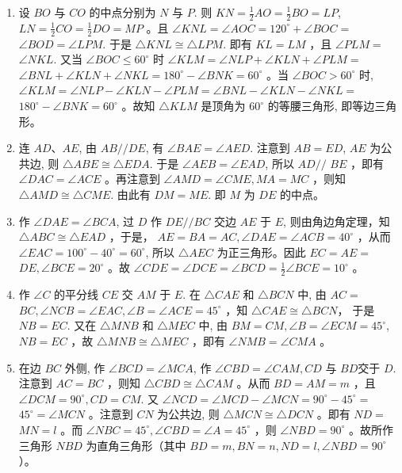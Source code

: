 \documentclass[10pt]{article}
\begin{document}
\begin{enumerate}
  \item 设 $B O$ 与 $C O$ 的中点分别为 $N$ 与 $P$. 则 $K N=\frac{1}{2} A O=\frac{1}{2} B O=L P$, $L N=\frac{1}{2} C O=\frac{1}{2} D O=M P$ 。且 $\angle K N L=\angle A O C=120^{\circ}+\angle B O C=$ $\angle B O D=\angle L P M$. 于是 $\triangle K N L \cong \triangle L P M$. 即有 $K L=L M$ ，且 $\angle P L M=$ $\angle N K L$. 又当 $\angle B O C \leqslant 60^{\circ}$ 时 $\angle K L M=\angle N L P+\angle K L N+\angle P L M=$ $\angle B N L+\angle K L N+\angle N K L=180^{\circ}-\angle B N K=60^{\circ}$ 。当 $\angle B O C>60^{\circ}$ 时, $\angle K L M=\angle N L P-\angle K L N-\angle P L M=\angle B N L-\angle K L N-\angle N K L=$ $180^{\circ}-\angle B N K=60^{\circ}$ 。故知 $\triangle K L M$ 是顶角为 $60^{\circ}$ 的等腰三角形, 即等边三角形。
  \item 连 $A D 、 A E$, 由 $A B / / D E$, 有 $\angle B A E=\angle A E D$. 注意到 $A B=E D$, $A E$ 为公共边, 则 $\triangle A B E \cong \triangle E D A$. 于是 $\angle A E B=\angle E A D$, 所以 $A D / /$ $B E$ ，即有 $\angle D A C=\angle A C E$ 。再注意到 $\angle A M D=\angle C M E, M A=M C$ ，则知 $\triangle A M D \cong \triangle C M E$. 由此有 $D M=M E$. 即 $M$ 为 $D E$ 的中点。
  \item 作 $\angle D A E=\angle B C A$, 过 $D$ 作 $D E / / B C$ 交边 $A E$ 于 $E$, 则由角边角定理，知 $\triangle A B C \cong \triangle E A D$ ，于是， $A E=B A=A C, \angle D A E=\angle A C B=40^{\circ}$ ，从而 $\angle E A C=100^{\circ}-40^{\circ}=60^{\circ}$, 所以 $\triangle A E C$ 为正三角形。因此 $E C=A E=$ $D E, \angle B C E=20^{\circ}$ 。故 $\angle C D E=\angle D C E=\angle B C D=\frac{1}{2} \angle B C E=10^{\circ}$ 。
  \item 作 $\angle C$ 的平分线 $C E$ 交 $A M$ 于 $E$. 在 $\triangle C A E$ 和 $\triangle B C N$ 中, 由 $A C=$\\
$B C, \angle N C B=\angle E A C, \angle B=\angle A C E=45^{\circ}$ ，知 $\triangle C A E \cong \triangle B C N ，$ 于是 $N B=E C$. 又在 $\triangle M N B$ 和 $\triangle M E C$ 中, 由 $B M=C M, \angle B=\angle E C M=45^{\circ}$, $N B=E C$ ，故 $\triangle M N B \cong \triangle M E C$ ，即有 $\angle N M B=\angle C M A$ 。
  \item 在边 $B C$ 外侧, 作 $\angle B C D=\angle M C A$, 作 $\angle C B D=\angle C A M, C D$ 与 $B D$交于 $D$. 注意到 $A C=B C$ ，则知 $\triangle C B D \cong \triangle C A M$ 。从而 $B D=A M=m$ ，且 $\angle D C M=90^{\circ}, C D=C M$. 又 $\angle N C D=\angle M C D-\angle M C N=90^{\circ}-45^{\circ}=$ $45^{\circ}=\angle M C N$ 。注意到 $C N$ 为公共边, 则 $\triangle M C N \cong \triangle D C N$ 。即有 $N D=$ $M N=l$ 。而 $\angle N B C=45^{\circ}, \angle C B D=\angle A=45^{\circ}$ ，则 $\angle N B D=90^{\circ}$ 。故所作三角形 $N B D$ 为直角三角形（其中 $B D=m, B N=n, N D=l, \angle N B D=90^{\circ}$ ）。

\end{enumerate}
\end{document}
